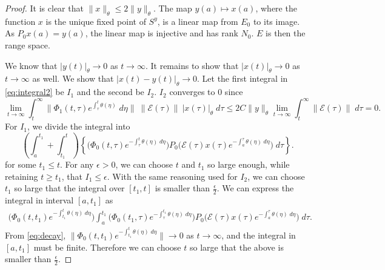 \documentclass[a4paper,11pt]{article}
\newcommand{\E}{\mathcal{E}}
\theoremstyle{remark}
\begin{document}
\begin{proof}
It is clear that $\|x\|_\theta \le 2\|y\|_\theta$. The map $y(a) \mapsto x(a)$, where the function $x$ is the unique fixed point of $S^y$, is a linear map from $E_0$ to its image. As $P_0x(a)=y(a)$, the linear map is injective and has rank $N_0$. $E$ is then the range space.


We know that $|y(t)|_\theta \rightarrow 0$ as $t \rightarrow \infty$. It remains to show that $|x(t)|_\theta \rightarrow 0$ as $t \rightarrow \infty$ as well. We show that $|x(t)-y(t)|_\theta \rightarrow 0$. Let the first integral in \eqref{eq:integral2} be $I_1$ and the second be $I_2$. $I_2$ converges to $0$ since
$$\lim_{t \rightarrow\infty}\int_t^\infty \|\Phi_1(t,\tau)e^{\int_\tau^t \theta(\eta)}\;d\eta\| \: \|\E(\tau)\| \:|x(\tau)|_\theta \; d\tau\le 2C\|y\|_\theta \lim_{t \rightarrow \infty}\int_t^\infty \|\E(\tau)\| \;d\tau = 0.$$
For $I_1$, we divide the integral into 
$$\left(\int_a^{t_1} + \int_{t_1}^t \right) \left\{\big(\Phi_0(t,\tau)e^{-\int_\tau^t \theta(\eta) \;d\eta}\big)P_0\big(\E(\tau) x(\tau)e^{-\int_a^\tau \theta(\eta) \;d\eta}\big) \;d\tau\right\}.$$
for some $t_1 \le t$. For any $\epsilon>0$, we can choose $t$ and $t_1$ so large enough, while retaining $t\ge t_1$, that $I_1 \le \epsilon$. With the same reasoning used for $I_2$, we can choose $t_1$ so large that the integral over $[t_1, t]$ is smaller than $ \frac{\epsilon}{2}$. We can express the integral in interval $[a,t_1]$ as
\begin{align*}
\big(\Phi_0(t,t_1)e^{-\int_{t_1}^t \theta(\eta)\;d\eta}\big) \int_a^{t_1} \big(\Phi_0(t_1,\tau)e^{-\int_\tau^{t_1} \theta(\eta) \;d\eta}\big)P_0\big(\E(\tau) x(\tau)e^{-\int_a^\tau \theta(\eta) \;d\eta}\big) \;d\tau.
\end{align*}
From \eqref{eq:decay}, $\|\Phi_0(t,t_1)e^{-\int_{t_1}^t \theta(\eta)\;d\eta}\| \rightarrow 0$ as $t \rightarrow \infty$, and the integral in $[a,t_1]$ must be finite. Therefore we can choose $t$ so large that the above is smaller than $ \frac{\epsilon}{2}$.

\end{proof}
\end{document}
